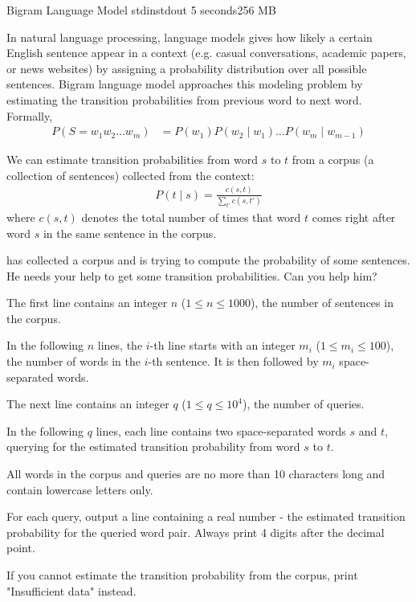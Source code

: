 
\begin{problem}{Bigram Language Model}
{stdin}{stdout}
{5 seconds}{256 MB}{}

In natural language processing, language models gives how likely a certain English sentence appear in a context (e.g. casual conversations, academic papers, or news websites) by assigning a probability distribution over all possible sentences. Bigram language model approaches this modeling problem by estimating the transition probabilities from previous word to next word. Formally,
\begin{align*}
	P(S = w_1 w_2 \hdots w_m) &= P(w_1)P(w_2 \mid w_1) \hdots P(w_m \mid w_{m-1})
\end{align*}

We can estimate transition probabilities from word $s$ to $t$ from a corpus (a collection of sentences) collected from the context:
\begin{align*}
	P(t \mid s) = \frac{c(s,t)}{\sum_{t'}{c(s,t')}}
\end{align*}
where $c(s,t)$ denotes the total number of times that word $t$ comes right after word $s$ in the same sentence in the corpus.

\Suzukaze has collected a corpus and is trying to compute the probability of some sentences. He needs your help to get some transition probabilities. Can you help him?

\InputFile

The first line contains an integer $n$ ($1 \le n \le 1000$), the number of sentences in the corpus.

In the following $n$ lines, the $i$-th line starts with an integer $m_i$ ($1 \le m_i \le 100$), the number of words in the $i$-th sentence. It is then followed by $m_i$ space-separated words.

The next line contains an integer $q$ ($1 \le q \le 10^4$), the number of queries.

In the following $q$ lines, each line contains two space-separated words $s$ and $t$, querying for the estimated transition probability from word $s$ to $t$.

All words in the corpus and queries are no more than 10 characters long and contain lowercase letters only.

\OutputFile

For each query, output a line containing a real number - the estimated transition probability for the queried word pair. Always print 4 digits after the decimal point.

If you cannot estimate the transition probability from the corpus, print "Insufficient data" instead.

\Examples

\begin{example}
%
\end{example}

\end{problem}
